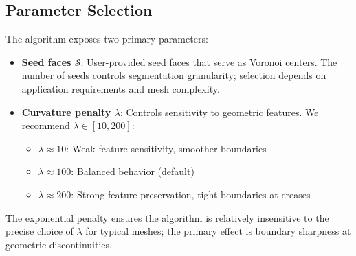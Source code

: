 \subsection{Parameter Selection}

The algorithm exposes two primary parameters:

\begin{itemize}
    \item \textbf{Seed faces $\mathcal{S}$}: User-provided seed faces that serve as Voronoi centers. The number of seeds controls segmentation granularity; selection depends on application requirements and mesh complexity.
    
    \item \textbf{Curvature penalty $\lambda$}: Controls sensitivity to geometric features. We recommend $\lambda \in [10, 200]$:
    \begin{itemize}
        \item $\lambda \approx 10$: Weak feature sensitivity, smoother boundaries
        \item $\lambda \approx 100$: Balanced behavior (default)
        \item $\lambda \approx 200$: Strong feature preservation, tight boundaries at creases
    \end{itemize}
\end{itemize}

The exponential penalty ensures the algorithm is relatively insensitive to the precise choice of $\lambda$ for typical meshes; the primary effect is boundary sharpness at geometric discontinuities.
